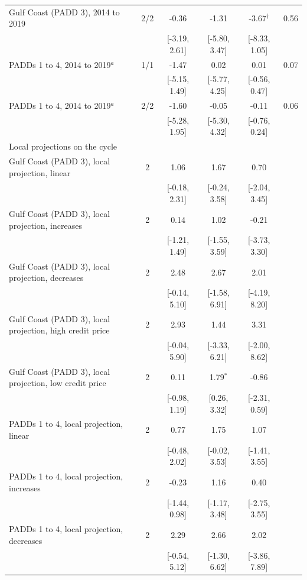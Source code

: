 \begin{table}[htbp]
\begin{tabular}{lccccc}
Gulf Coast (PADD 3), 2014 to 2019 & 2/2 & -0.36 & -1.31 & -3.67$^{\dagger}$ & 0.56 \\
\footnotesize  &  & [-3.19, 2.61] & [-5.80, 3.47] & [-8.33, 1.05] &  \\[2pt]
PADDs 1 to 4, 2014 to 2019$^{a}$ & 1/1 & -1.47 & 0.02 & 0.01 & 0.07 \\
\footnotesize  &  & [-5.15, 1.49] & [-5.77, 4.25] & [-0.56, 0.47] &  \\[2pt]
PADDs 1 to 4, 2014 to 2019$^{a}$ & 2/2 & -1.60 & -0.05 & -0.11 & 0.06 \\
\footnotesize  &  & [-5.28, 1.95] & [-5.30, 4.32] & [-0.76, 0.24] &  \\[2pt]
\midrule
\multicolumn{6}{l}{Local projections on the cycle} \\
\midrule
Gulf Coast (PADD 3), local projection, linear & 2 & 1.06 & 1.67 & 0.70 &  \\
\footnotesize  &  & [-0.18, 2.31] & [-0.24, 3.58] & [-2.04, 3.45] &  \\[2pt]
Gulf Coast (PADD 3), local projection, increases & 2 & 0.14 & 1.02 & -0.21 &  \\
\footnotesize  &  & [-1.21, 1.49] & [-1.55, 3.59] & [-3.73, 3.30] &  \\[2pt]
Gulf Coast (PADD 3), local projection, decreases & 2 & 2.48 & 2.67 & 2.01 &  \\
\footnotesize  &  & [-0.14, 5.10] & [-1.58, 6.91] & [-4.19, 8.20] &  \\[2pt]
Gulf Coast (PADD 3), local projection, high credit price & 2 & 2.93 & 1.44 & 3.31 &  \\
\footnotesize  &  & [-0.04, 5.90] & [-3.33, 6.21] & [-2.00, 8.62] &  \\[2pt]
Gulf Coast (PADD 3), local projection, low credit price & 2 & 0.11 & 1.79$^{*}$ & -0.86 &  \\
\footnotesize  &  & [-0.98, 1.19] & [0.26, 3.32] & [-2.31, 0.59] &  \\[2pt]
PADDs 1 to 4, local projection, linear & 2 & 0.77 & 1.75 & 1.07 &  \\
\footnotesize  &  & [-0.48, 2.02] & [-0.02, 3.53] & [-1.41, 3.55] &  \\[2pt]
PADDs 1 to 4, local projection, increases & 2 & -0.23 & 1.16 & 0.40 &  \\
\footnotesize  &  & [-1.44, 0.98] & [-1.17, 3.48] & [-2.75, 3.55] &  \\[2pt]
PADDs 1 to 4, local projection, decreases & 2 & 2.29 & 2.66 & 2.02 &  \\
\footnotesize  &  & [-0.54, 5.12] & [-1.30, 6.62] & [-3.86, 7.89] &  \\[2pt]

\end{tabular}
\end{table}
